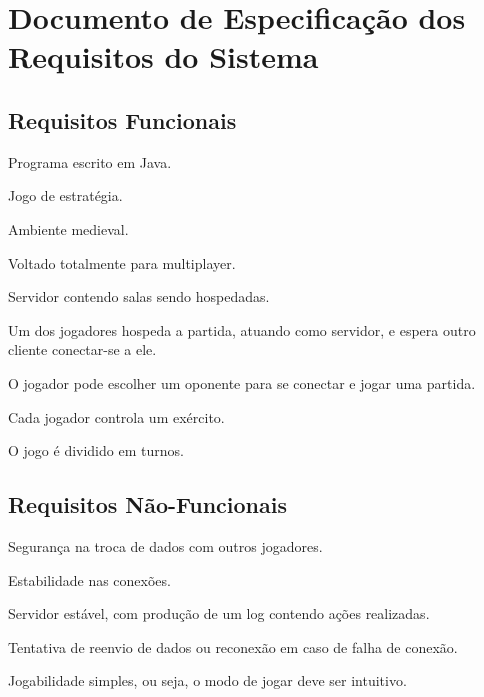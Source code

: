 \section{Documento de Especificação dos Requisitos do Sistema}

\subsection{Requisitos Funcionais}

\begin{itemise}
    \item Programa escrito em Java.
    \item Jogo de estratégia.
    \item Ambiente medieval.
    \item Voltado totalmente para multiplayer.
    \item Servidor contendo salas sendo hospedadas.
    \item Um dos jogadores hospeda a partida, atuando como servidor, e espera outro cliente conectar-se a ele.
    \item O jogador pode escolher um oponente para se conectar e jogar uma partida.
    \item Cada jogador controla um exército.
    \item O jogo é dividido em turnos.
\end{itemise}

\subsection{Requisitos Não-Funcionais}

\begin{itemise}
    \item Segurança na troca de dados com outros jogadores.
    \item Estabilidade nas conexões.
    \item Servidor estável, com produção de um log contendo ações realizadas.
    \item Tentativa de reenvio de dados ou reconexão em caso de falha de conexão.
    \item Jogabilidade simples, ou seja, o modo de jogar deve ser intuitivo.
\end{itemise}
